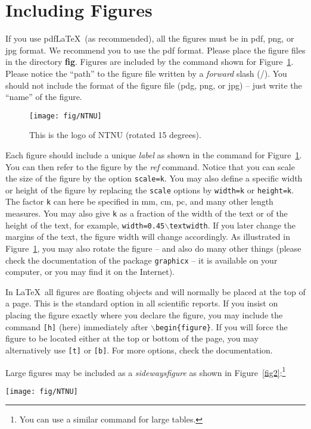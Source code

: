 \documentclass[12pt]{report}
\begin{document}
\section{Including Figures}
If you use pdf\LaTeX\ (as recommended), all the figures must be in pdf, png, or jpg format. We recommend you to use the pdf format.  Please place the figure files in the directory \textbf{fig}. Figures are included by the command shown for Figure~\ref{fig1}. Please notice the ``path'' to the figure file written by a \emph{forward} slash (/). You should not include the format of the figure file (pdg, png, or jpg) -- just write the ``name'' of the figure. 
\begin{figure}
\centering
\texttt{[image: fig/NTNU]}
\caption{This is the logo of NTNU (rotated 15 degrees).}
\label{fig1}
\end{figure}

Each figure should include a unique \emph{label} as shown in the command for Figure~\ref{fig1}. You can then refer to the figure by the \emph{ref} command.
Notice that you can scale the size of the figure by the option \texttt{scale=k}. You may also define a specific width or height of the figure by replacing the \texttt{scale} options by \texttt{width=k} or \texttt{height=k}. The factor \texttt{k} can here be specified in mm, cm, pc, and many other length measures. You may also give \texttt{k} as a fraction of the width of the text or of the height of the text, for example, \texttt{width=0.45$\backslash$textwidth}. If you later change the margins of the text, the figure width will change accordingly. As illustrated in Figure~\ref{fig1}, you may also rotate the figure -- and also do many other things (please check the documentation of the package \texttt{graphicx} -- it is available on your computer, or you may find it on the Internet).

In \LaTeX\ all figures are floating objects and will normally be placed at the top of a page. This is the standard option in all scientific reports. If you insist on placing the figure exactly where you declare the figure, you may include the command \texttt{[h]} (here) immediately after $\backslash$\texttt{begin\{figure\}}. If you will force the figure to be located either at the top or bottom of the page, you may alternatively use  \texttt{[t]} or \texttt{[b]}. For more options, check the documentation.

Large figures may be included as a \emph{sidewaysfigure} as shown in Figure~\ref{fig2}:\footnote{You can use a similar command for large tables.}
\begin{sidewaysfigure}
\centering
\texttt{[image: fig/NTNU]}
\caption{This is the logo of NTNU.}
\label{fig2}
\end{sidewaysfigure}
\end{document}
